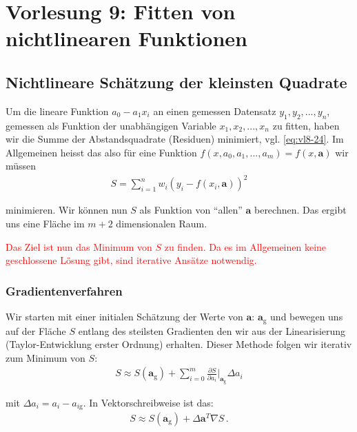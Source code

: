 \section{Vorlesung 9: Fitten von nichtlinearen Funktionen}
\label{sec:vl9}


\subsection{Nichtlineare Sch\"atzung der kleinsten Quadrate}
\label{subsec:vl9}

Um die lineare Funktion $a_0 - a_1 x_i$ an einen gemessen Datensatz $y_1, y_2, ..., y_n$, gemessen als Funktion der unabh\"angigen Variable $x_1, x_2, ..., x_n$ zu fitten, haben wir die Summe der Abstandsquadrate (Residuen) minimiert, vgl. \cref{eq:vl8-24}. Im Allgemeinen heisst das also f\"ur eine Funktion $f(x, a_0, a_1, ..., a_m) = f(x, \boldsymbol{a})$ wir m\"ussen
\begin{align}
S = \sum_{i=1}^n w_i (y_i - f(x_i, \boldsymbol{a}) )^2
\label{eq:vl9-1}
\end{align}

minimieren. Wir k\"onnen nun $S$ als Funktion von ``allen'' $\boldsymbol{a}$ berechnen. Das ergibt uns eine Fl\"ache im $m + 2$ dimensionalen Raum.

\begin{center}
    \textcolor{red}{Das Ziel ist nun das Minimum von $S$ zu finden. Da es im Allgemeinen keine geschlossene L\"osung gibt, sind iterative Ans\"atze notwendig.}
\end{center}


\subsubsection{Gradientenverfahren}
\label{subsubsec:vl9-1}

Wir starten mit einer initialen Sch\"atzung der Werte von $\boldsymbol{a}$: $\boldsymbol{a}_\mathrm{g}$ und bewegen uns auf der Fl\"ache $S$ entlang des steilsten Gradienten den wir aus der Linearisierung (Taylor-Entwicklung erster Ordnung) erhalten. Dieser Methode folgen wir iterativ zum Minimum von $S$:
\begin{align}
S \approx S(\boldsymbol{a}_\mathrm{g}) + \sum_{i=0}^m \frac{ \partial S }{ \partial a_i } \bigg|_{\boldsymbol{a}_\mathrm{g}} \Delta a_i
\label{eq:vl9-2}
\end{align}

mit $\Delta a_i = a_i - a_{i\mathrm{g}}$. In Vektorschreibweise ist das:
\begin{align}
S \approx S(\boldsymbol{a}_\mathrm{g}) + \Delta \boldsymbol{a}^T \nabla S\,.
\label{eq:vl9-3}
\end{align}

